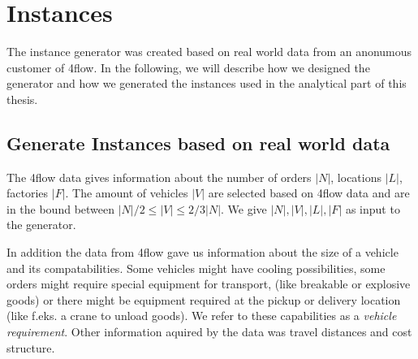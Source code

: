 \documentclass[../main.tex]{subfiles}
\begin{document}
\section{Instances}
\label{sec:ins}
The instance generator was created based on real world data from an anonumous customer of 4flow. 
In the following, we will describe how we designed the generator and how we generated the instances used in the analytical part of this thesis.

\subsection{Generate Instances based on real world data}
\label{sec:data}
The 4flow data gives information about the number of orders $|N|$, locations $|L|$, factories $|F|$. 
The amount of vehicles $|V|$ are selected based on 4flow data and are in the bound between $|N|/2 \leq |V| \leq 2/3 |N|$.
We give $|N|, |V|, |L|, |F|$ as input to the generator.\par
In addition the data from 4flow gave us information about the size of a vehicle and its compatabilities. 
Some vehicles might have cooling possibilities, some orders might require special equipment for transport, (like breakable or explosive goods) or there might be equipment required at the pickup or delivery location (like f.eks. a crane to unload goods).
We refer to these capabilities as a \emph{vehicle requirement}.
Other information aquired by the data was travel distances and cost structure.
\end{document}
